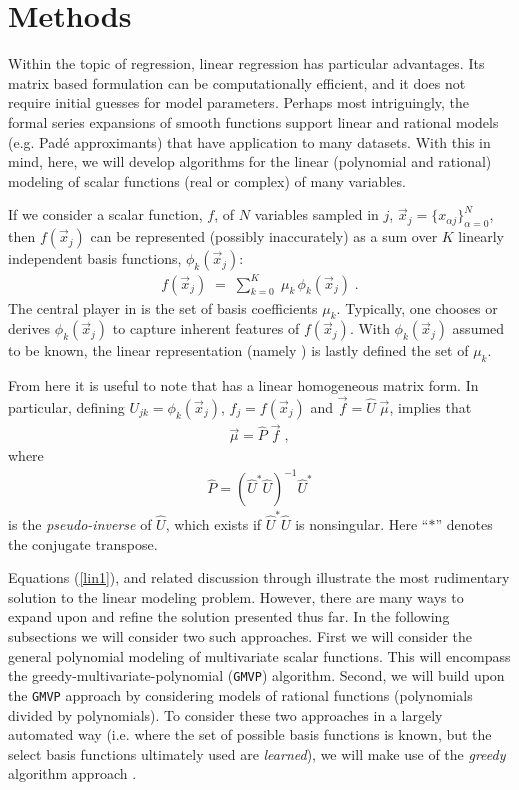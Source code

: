 \documentclass[twocolumn,aps,prd,floatfix,preprintnumbers,a4paper,nofootinbib,
superscriptaddress,10pt]{revtex4-1}
\def\gmvp#1{greedy-multivariate-polynomial#1
  (\texttt{GMVP}#1)\gdef\gmvp{\texttt{GMVP}}}
\begin{document}
\section{Methods}
\label{meth}
%
Within the topic of regression, linear regression has particular advantages.
%
Its matrix based formulation can be computationally efficient, and it does not require initial guesses for model parameters.
%
Perhaps most intriguingly, the formal series expansions of smooth functions support linear and rational models (e.g. Pad\'e approximants) that have application to many datasets.
%
With this in mind, here, we will develop algorithms for the linear (polynomial and rational) modeling of scalar functions (real or complex) of many variables.
%
\par If we consider a scalar function, $f$, of $N$ variables sampled in $j$, $\vec{x}_j = \{x_{\alpha j}\}_{\alpha=0}^{N}$, then $f(\vec{x}_j)$ can be represented (possibly inaccurately) as a sum over $K$ linearly independent basis functions, $\phi_k(\vec{x}_j)$:
%
\begin{align}
  \label{lin1}
  f({\vec{x}}_j) \; = \; \sum_{k=0}^{K} \; \mu_{k} \, \phi_k(\vec{x}_j)\; .
\end{align}
%
The central player in  is the set of basis coefficients $\mu_{k}$.
%
Typically, one chooses or derives $\phi_{k}(\vec{x}_j)$ to capture inherent features of $f(\vec{x}_j)$.
%
With $\phi_{k}(\vec{x}_j)$ assumed to be known, the linear representation (namely ) is lastly defined the set of $\mu_k$.
%
\def\vecmu{\vec{\mu}}
\def\vecf{\vec{f}}
\def\hatU{\hat{U}}
\def\hatP{\hat{P}}
%
\par From here it is useful to note that  has a linear homogeneous matrix form.
%
In particular, defining ${U}_{jk} = \phi_k(\vec{x}_j)$, $f_j = f(\vec{x}_j)$ and $\vec{f} = \hat{U} \; \vec{\mu}$, implies that
%
\begin{align}
  \label{eq:linsol1}
  \vecmu = \hatP \; \vecf \; ,
\end{align}
%
where
%
\begin{align}
  \label{pinv1}
  \hatP = \left( \hatU^{*} \hatU \right)^{-1}\hatU^{*}
\end{align}
%
is the \textit{pseudo-inverse} \cite{Moore1920,Penrose:1955} of $\hatU$, which exists if $\hatU^{*} \hatU$ is nonsingular.
%
Here ``$*$'' denotes the conjugate transpose.
%
\par Equations (\ref{lin1}), and related discussion through  illustrate the most rudimentary solution to the linear modeling problem.
%
However, there are many ways to expand upon and refine the solution presented thus far.
%
In the following subsections we will consider two such approaches.
%
First we will consider the general polynomial modeling of multivariate scalar functions.
%
This will encompass the \gmvp{} algorithm.
%
Second, we will build upon the \gmvp{} approach by considering models of rational functions (polynomials divided by polynomials).
%
To consider these two approaches in a largely automated way (i.e. where the set of possible basis functions is known, but the select basis functions ultimately used are \textit{learned}), we will make use of the \textit{greedy} algorithm approach \cite{Field:2011mf, GVK022791892, 1978AnSta, Pandit84}.
%
\end{document}
